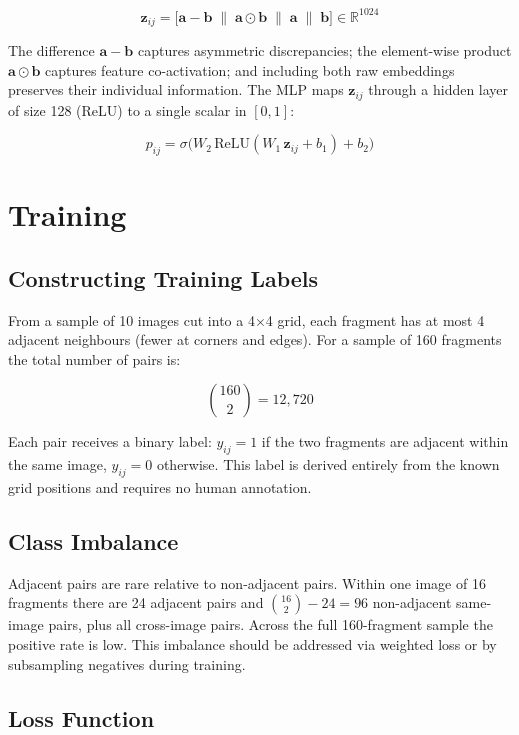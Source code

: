 \documentclass[12pt, a4paper]{article}
\begin{document}
\[
\mathbf{z}_{ij} = \bigl[\mathbf{a} - \mathbf{b} \;\|\; \mathbf{a} \odot \mathbf{b} \;\|\; \mathbf{a} \;\|\; \mathbf{b}\bigr] \in \mathbb{R}^{1024}
\]

The difference $\mathbf{a} - \mathbf{b}$ captures asymmetric discrepancies; the
element-wise product $\mathbf{a} \odot \mathbf{b}$ captures feature co-activation; and
including both raw embeddings preserves their individual information. The MLP maps
$\mathbf{z}_{ij}$ through a hidden layer of size 128 (ReLU) to a single scalar in
$[0, 1]$:

\[
p_{ij} = \sigma\!\bigl(W_2\,\text{ReLU}(W_1\,\mathbf{z}_{ij} + b_1) + b_2\bigr)
\]

\section{Training}

\subsection{Constructing Training Labels}

From a sample of 10 images cut into a 4$\times$4 grid, each fragment has at most 4
adjacent neighbours (fewer at corners and edges). For a sample of 160 fragments the
total number of pairs is:

\[
\binom{160}{2} = 12{,}720
\]

Each pair receives a binary label: $y_{ij} = 1$ if the two fragments are adjacent within
the same image, $y_{ij} = 0$ otherwise. This label is derived entirely from the known
grid positions and requires no human annotation.

\subsection{Class Imbalance}

Adjacent pairs are rare relative to non-adjacent pairs. Within one image of 16 fragments
there are 24 adjacent pairs and $\binom{16}{2} - 24 = 96$ non-adjacent same-image pairs,
plus all cross-image pairs. Across the full 160-fragment sample the positive rate is low.
This imbalance should be addressed via weighted loss or by subsampling negatives during
training.

\subsection{Loss Function}
\end{document}
